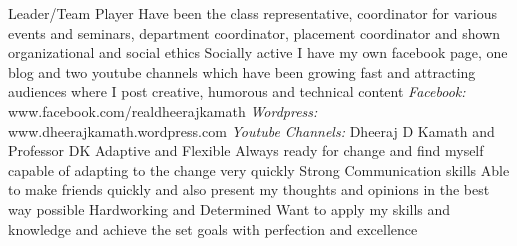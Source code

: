 \begin{cvhonors}
  \cvhonor
    {Leader/Team Player}
    {Have been the class representative, coordinator for various events and seminars, department coordinator, placement coordinator and shown organizational and social ethics}
    {}
    {}
    \cvhonor
    {Socially active}
    {I have my own facebook page, one blog and two youtube channels which have been growing fast and attracting audiences where I post creative, humorous and technical content \newline \textsl{Facebook:} \textcolor{awesome-emerald}{www.facebook.com/realdheerajkamath} \newline \textsl{Wordpress:} \textcolor{awesome-emerald}{www.dheerajkamath.wordpress.com} \newline \textsl{Youtube Channels:} \textcolor{awesome-emerald}{Dheeraj D Kamath} and \textcolor{awesome-emerald}{Professor DK}}
    {}
    {}
     \cvhonor
    {Adaptive and Flexible}
    {Always ready for change and find myself capable of adapting to the change very quickly}
    {}
    {}
     \cvhonor
    {Strong Communication skills}
    {Able to make friends quickly and also present my thoughts and opinions in the best way possible}
    {}
    {}
    \cvhonor
    {Hardworking and Determined}
    {Want to apply my skills and knowledge and achieve the set goals with perfection and excellence}
    {}
    {}
\end{cvhonors}
